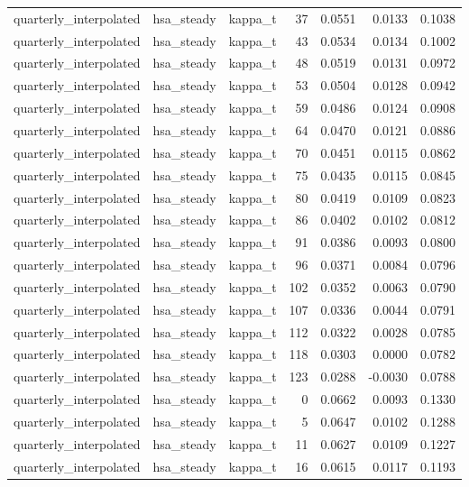 \begin{tabular}{lllrrrr}
quarterly\_interpolated & hsa\_steady & kappa\_t & 37 & 0.0551 & 0.0133 & 0.1038 \\
quarterly\_interpolated & hsa\_steady & kappa\_t & 43 & 0.0534 & 0.0134 & 0.1002 \\
quarterly\_interpolated & hsa\_steady & kappa\_t & 48 & 0.0519 & 0.0131 & 0.0972 \\
quarterly\_interpolated & hsa\_steady & kappa\_t & 53 & 0.0504 & 0.0128 & 0.0942 \\
quarterly\_interpolated & hsa\_steady & kappa\_t & 59 & 0.0486 & 0.0124 & 0.0908 \\
quarterly\_interpolated & hsa\_steady & kappa\_t & 64 & 0.0470 & 0.0121 & 0.0886 \\
quarterly\_interpolated & hsa\_steady & kappa\_t & 70 & 0.0451 & 0.0115 & 0.0862 \\
quarterly\_interpolated & hsa\_steady & kappa\_t & 75 & 0.0435 & 0.0115 & 0.0845 \\
quarterly\_interpolated & hsa\_steady & kappa\_t & 80 & 0.0419 & 0.0109 & 0.0823 \\
quarterly\_interpolated & hsa\_steady & kappa\_t & 86 & 0.0402 & 0.0102 & 0.0812 \\
quarterly\_interpolated & hsa\_steady & kappa\_t & 91 & 0.0386 & 0.0093 & 0.0800 \\
quarterly\_interpolated & hsa\_steady & kappa\_t & 96 & 0.0371 & 0.0084 & 0.0796 \\
quarterly\_interpolated & hsa\_steady & kappa\_t & 102 & 0.0352 & 0.0063 & 0.0790 \\
quarterly\_interpolated & hsa\_steady & kappa\_t & 107 & 0.0336 & 0.0044 & 0.0791 \\
quarterly\_interpolated & hsa\_steady & kappa\_t & 112 & 0.0322 & 0.0028 & 0.0785 \\
quarterly\_interpolated & hsa\_steady & kappa\_t & 118 & 0.0303 & 0.0000 & 0.0782 \\
quarterly\_interpolated & hsa\_steady & kappa\_t & 123 & 0.0288 & -0.0030 & 0.0788 \\
quarterly\_interpolated & hsa\_steady & kappa\_t & 0 & 0.0662 & 0.0093 & 0.1330 \\
quarterly\_interpolated & hsa\_steady & kappa\_t & 5 & 0.0647 & 0.0102 & 0.1288 \\
quarterly\_interpolated & hsa\_steady & kappa\_t & 11 & 0.0627 & 0.0109 & 0.1227 \\
quarterly\_interpolated & hsa\_steady & kappa\_t & 16 & 0.0615 & 0.0117 & 0.1193 \\

\end{tabular}
